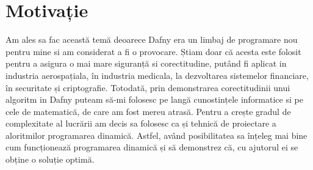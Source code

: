\chapter*{Motivație} 

Am ales sa fac această temă deoarece Dafny era un limbaj de programare nou pentru mine si am considerat a fi o provocare. Știam doar că acesta este folosit pentru a asigura o mai mare siguranță si corectitudine, putând fi aplicat in industria aerospațiala, în industria medicala, la dezvoltarea sistemelor financiare, în securitate și  criptografie. Totodată, prin demonstrarea corectitudinii unui algoritm in Dafny puteam să-mi folosesc pe langă cunostințele informatice si pe cele  de matematică, de care am fost mereu atrasă. Pentru a crește gradul de complexitate al lucrării am decis sa folosesc ca și tehnică de proiectare a aloritmilor programarea dinamică. Astfel, având posibilitatea sa înțeleg mai bine cum funcționează programarea dinamică și să demonstrez că, cu ajutorul ei se obține o soluție optimă. 